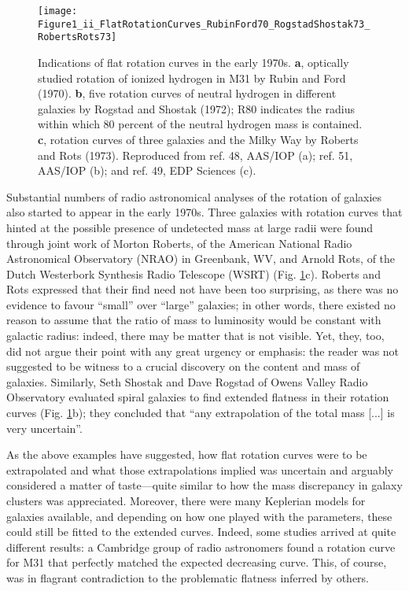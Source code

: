 \documentclass{naturefig}
\begin{document}
\begin{figure}[t]
\centering
\texttt{[image: Figure1\_ii\_FlatRotationCurves\_RubinFord70\_RogstadShostak73\_RobertsRots73]}
\caption{\label{fig:rotcurv}Indications of flat rotation curves in the early 1970s. \textbf{a}, optically studied rotation of ionized hydrogen in M31 by Rubin and Ford (1970). \textbf{b}, five rotation curves of neutral hydrogen in different galaxies by Rogstad and Shostak (1972); R80 indicates the radius within which 80 percent of the neutral hydrogen mass is contained. \textbf{c}, rotation curves of three galaxies and the Milky Way by Roberts and Rots (1973). Reproduced from ref. 48, AAS/IOP (a); ref. 51, AAS/IOP (b); and ref. 49, EDP Sciences (c).}
\end{figure}

Substantial numbers of radio astronomical analyses of the rotation of galaxies also started to appear in the early 1970s. Three galaxies with rotation curves that hinted at the possible presence of undetected mass at large radii were found through joint work of Morton Roberts, of the American National Radio Astronomical Observatory (NRAO) in Greenbank, WV, and Arnold Rots, of the Dutch Westerbork Synthesis Radio Telescope (WSRT) (Fig. \ref{fig:rotcurv}c). Roberts and Rots expressed that their find need not have been too surprising, as there was no evidence to favour ``small'' over ``large'' galaxies;\cite{Roberts1973} %
in other words, there existed no reason to assume that the ratio of mass to luminosity would be constant with galactic radius: indeed, there may be matter that is not visible. Yet, they, too, did not argue their point with any great urgency or emphasis: the reader was not suggested to be witness to a crucial discovery on the content and mass of galaxies. Similarly, Seth Shostak and Dave Rogstad of Owens Valley Radio Observatory evaluated spiral galaxies to find extended flatness in their rotation curves (Fig. \ref{fig:rotcurv}b);\cite{Shostak1972,Rogstad1972} they concluded that ``any extrapolation of the total mass [...] is very uncertain''.\cite{Rogstad1973} %



As the above examples have suggested, how flat rotation curves were to be extrapolated and what those extrapolations implied was uncertain and arguably considered a matter of taste---quite similar to how the mass discrepancy in galaxy clusters was appreciated. Moreover, there were many Keplerian models for galaxies available,\cite{Brandt1960,Toomre1963} and depending on how one played with the parameters, these could still be fitted to the extended curves.\cite{Rogstad1972,Huchtmeier1975} Indeed, some studies arrived at quite different results: a Cambridge group of radio astronomers found a rotation curve for M31 that perfectly matched the expected decreasing curve.\cite{Emerson1973,Baldwin1975} This, of course, was in flagrant contradiction to the problematic flatness inferred by others.\cite{Roberts1975}
\end{document}
